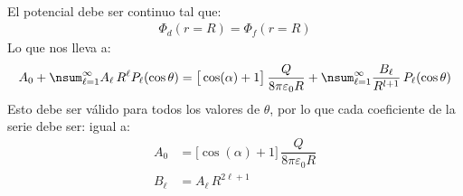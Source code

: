 \begin{enumerate}
\begin{align*}
\end{align*}
El potencial debe ser continuo tal que:
\begin{align*}
\Phi_{d} (r = R) = \Phi_{f} (r = R)
\end{align*}
Lo que nos lleva a:
\begin{align*}
A_{0} + \nsum_{\ell=1}^{\infty} A_{\ell} \, R^{\ell} P_{\ell} (\cos \theta) = \big[ \cos (\alpha) + 1 \big] \, \dfrac{Q}{8 \pi \varepsilon_{0} R} + \nsum_{\ell=1}^{\infty} \dfrac{B_{\ell}}{R^{l+1}} \, P_{\ell} (\cos \theta)
\end{align*}
Esto debe ser válido para todos los valores de $\theta$, por lo que cada coeficiente de la serie debe ser:
igual a:
\begin{align*}
A_{0} &= \big[ \cos (\alpha) + 1 \big] \, \dfrac{Q}{8 \pi \varepsilon_{0} R} \\[0.5em]
B_{\ell} &= A_{\ell}\, R^{2\ell+1}
\end{align*}


\end{enumerate}
